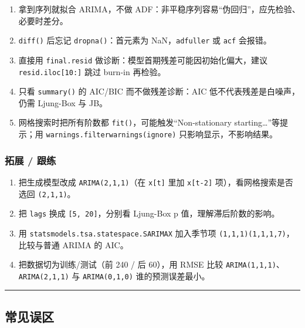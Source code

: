 \begin{enumerate}
\def\labelenumi{\arabic{enumi}.}
\tightlist
\item
  拿到序列就拟合 ARIMA，不做
  ADF：非平稳序列容易``伪回归''，应先检验、必要时差分。
\item
  \texttt{diff()} 后忘记 \texttt{dropna()}：首元素为
  NaN，\texttt{adfuller} 或 \texttt{acf} 会报错。
\item
  直接用 \texttt{final.resid} 做诊断：模型首期残差可能因初始化偏大，建议
  \texttt{resid.iloc{[}10:{]}} 跳过 burn-in 再检验。
\item
  只看 \texttt{summary()} 的 AIC/BIC 而不做残差诊断：AIC
  低不代表残差是白噪声，仍需 Ljung-Box 与 JB。
\item
  网格搜索时把所有阶数都 \texttt{fit()}，可能触发``Non-stationary
  starting\ldots''等提示；用
  \texttt{warnings.filterwarnings(\textquotesingle{}ignore\textquotesingle{})}
  只影响显示，不影响结果。
\end{enumerate}

\subsubsection{拓展 / 跟练}\label{ux62d3ux5c55-ux8ddfux7ec3-18}

\begin{enumerate}
\def\labelenumi{\arabic{enumi}.}
\tightlist
\item
  把生成模型改成 \texttt{ARIMA(2,1,1)}（在 \texttt{x{[}t{]}} 里加
  \texttt{x{[}t-2{]}} 项），看网格搜索是否选回 \texttt{(2,1,1)}。
\item
  把 \texttt{lags} 换成 \texttt{{[}5,\ 20{]}}，分别看 Ljung-Box p
  值，理解滞后阶数的影响。
\item
  用 \texttt{statsmodels.tsa.statespace.SARIMAX} 加入季节项
  \texttt{(1,1,1)(1,1,1,7)}，比较与普通 ARIMA 的 AIC。
\item
  把数据切为训练/测试（前 240 / 后 60），用 RMSE 比较
  \texttt{ARIMA(1,1,1)}、\texttt{ARIMA(2,1,1)} 与 \texttt{ARIMA(0,1,0)}
  谁的预测误差最小。
\end{enumerate}

\begin{center}\rule{0.5\linewidth}{0.5pt}\end{center}

\subsection{常见误区}\label{ux5e38ux89c1ux8befux533a-21}

